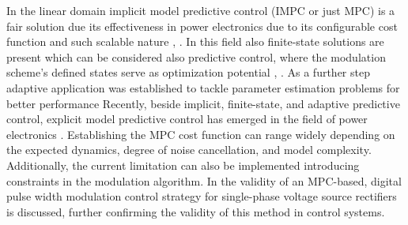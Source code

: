     In the linear domain implicit model predictive control (IMPC or just MPC) is a fair solution due its effectiveness in power electronics due to its configurable cost function and such scalable nature \cite{kelemen2010constrained}, \cite{ahmed2014model}. In this field also finite-state solutions are present which can be considered also predictive control, where the modulation scheme’s defined states serve as optimization potential \cite{rivera2013predictive}, \cite{godlewska2015predictive}. As a further step adaptive application was established to tackle parameter estimation problems for better performance \cite{muthukumar2016adaptive}
    Recently, beside implicit, finite-state, and adaptive predictive control, explicit model predictive control has emerged in the field of power electronics \cite{kutasi2010constrained}. Establishing the MPC cost function can range widely depending on the expected dynamics, degree of noise cancellation, and model complexity. Additionally, the current limitation can also be implemented introducing constraints in the modulation algorithm.
    In \cite{ahmed2014model} the validity of an MPC-based, digital pulse width modulation control strategy for single-phase voltage source rectifiers is discussed, further confirming the validity of this method in control systems.



